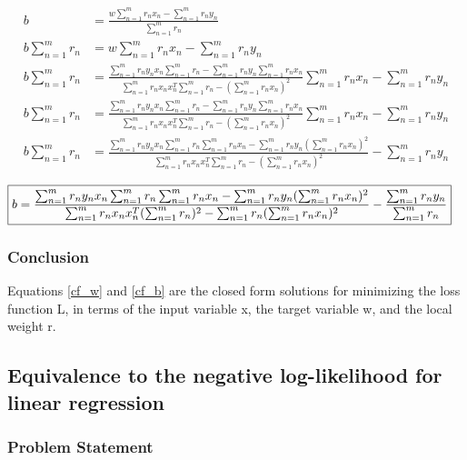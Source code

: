 \documentclass[a4paper]{article}
\begin{document}
\begin{align*}
	b &= \frac{w \sum_{n=1}^m r_n x_n - \sum_{n=1}^m  r_n y_n}{\sum_{n=1}^m  r_n} \\
	b \sum_{n=1}^m  r_n &= w \sum_{n=1}^m r_n x_n - \sum_{n=1}^m  r_n y_n\\
	b \sum_{n=1}^m  r_n &= \frac{\sum_{n=1}^m  r_n y_n x_n \sum_{n=1}^m  r_n - \sum_{n=1}^m  r_n y_n \sum_{n=1}^m  r_n x_n}{\sum_{n=1}^m r_n x_n x_n^T \sum_{n=1}^m  r_n - ({\sum_{n=1}^m r_n x_n})^2} \sum_{n=1}^m r_n x_n - \sum_{n=1}^m  r_n y_n\\
	b \sum_{n=1}^m  r_n &= \frac{\sum_{n=1}^m  r_n y_n x_n \sum_{n=1}^m  r_n - \sum_{n=1}^m  r_n y_n \sum_{n=1}^m  r_n x_n}{\sum_{n=1}^m r_n x_n x_n^T \sum_{n=1}^m  r_n - ({\sum_{n=1}^m r_n x_n})^2} \sum_{n=1}^m r_n x_n - \sum_{n=1}^m  r_n y_n\\
	b \sum_{n=1}^m  r_n &= \frac{\sum_{n=1}^m  r_n y_n x_n \sum_{n=1}^m  r_n \sum_{n=1}^m r_n x_n - \sum_{n=1}^m  r_n y_n (\sum_{n=1}^m  r_n x_n)^2}{\sum_{n=1}^m r_n x_n x_n^T \sum_{n=1}^m  r_n - ({\sum_{n=1}^m r_n x_n})^2} - \sum_{n=1}^m  r_n y_n
\end{align*}

\begin{align}
\label{cf_b}
	\Aboxed{b &= \frac{\sum_{n=1}^m r_n y_n x_n \sum_{n=1}^m r_n \sum_{n=1}^mr_n x_n - \sum_{n=1}^m r_n y_n (\sum_{n=1}^m r_n x_n)^2}{\sum_{n=1}^mr_n x_n x_n^T (\sum_{n=1}^m r_n)^2 - \sum_{n=1}^m r_n ({\sum_{n=1}^mr_n x_n})^2} - \frac{\sum_{n=1}^m r_n y_n}{\sum_{n=1}^m r_n}}
\end{align}

\vspace{5mm}

\subsubsection{Conclusion}
Equations \ref{cf_w} and \ref{cf_b} are the closed form solutions for minimizing the loss function L, in terms of the input variable x, the target variable w, and the local weight r.

\newpage


\subsection{Equivalence to the negative log-likelihood for linear regression}

\subsubsection{Problem Statement}
\end{document}
